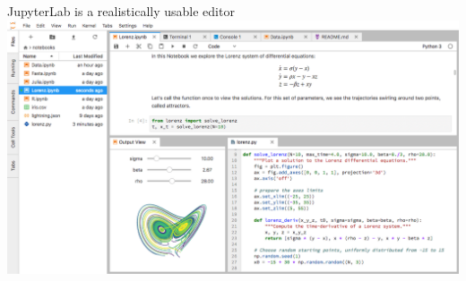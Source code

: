 \documentclass[aspectratio=169]{beamer}
\begin{document}
\begin{frame}{JupyterLab is a realistically usable editor}
\vspace{0.35 cm}
\includegraphics[width=0.95\linewidth]{jupyterlab.png}
\end{frame}















\end{document}
